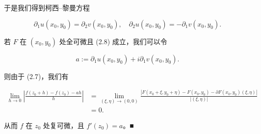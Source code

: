 \begin{theorem}
\begin{subitems}
于是我们得到柯西–黎曼方程

\begin{equation}
\partial_1 u(x_0, y_0) = \partial_2 v(x_0, y_0) , \quad \partial_2 u(x_0, y_0) = -\partial_1 v(x_0, y_0) .\tag{2.8}
\end{equation}
\item

若 $ F $ 在 $ (x_0, y_0) $ 处全可微且 (2.8) 成立，我们可以令

\[
a := \partial_1 u(x_0, y_0) + i \partial_1 v(x_0, y_0) .
\]

则由于 (2.7)，我们有

\begin{equation*}
\begin{aligned}
\lim_{h \to 0} \left| \frac{f(z_0 + h) - f(z_0) - ah}{h} \right| &= \lim_{(\xi,\eta) \to (0,0)} \frac{|F(x_0 + \xi, y_0 + \eta) - F(x_0, y_0) - \partial F(x_0, y_0)(\xi, \eta)|}{|(\xi, \eta)|} \\ &= 0 .
\end{aligned}
\end{equation*}

从而 $ f $ 在 $ z_0 $ 处复可微，且 $ f'(z_0) = a $。\nobreak\hspace{0.35em}■

\end{subitems}

\end{theorem}

